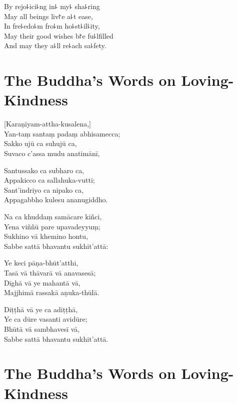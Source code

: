 \begin{english}
  By rejo꜕ici꜕ng in꜕ my꜕ sha꜕ring\\
  May all beings liv꜓e a꜕t ease,\\
  In fre꜕edo꜕m fro꜕m ho꜕st꜕il꜕ity,\\
  May their good wishes b꜓e fu꜕lfilled\\
  And may they a꜕ll re꜕ach sa꜕fety.
\end{english}

\chapter[Loving-Kindness]{The Buddha's Words on Loving-Kindness}%

\begin{leader}
\end{leader}

[Karaṇīyam-attha-kusalena,]\\
Yan-taṃ santaṃ padaṃ abhisamecca;\\
Sakko ujū ca suhujū ca,\\
Suvaco c'assa mudu anatimānī,

Santussako ca subharo ca,\\
Appakicco ca sallahuka-vutti;\\
Sant'indriyo ca nipako ca,\\
Appagabbho kulesu ananugiddho.

Na ca khuddaṃ samācare kiñci,\\
Yena viññū pare upavadeyyuṃ;\\
Sukhino vā khemino hontu,\\
Sabbe sattā bhavantu sukhit'attā:

Ye keci pāṇa-bhūt'atthi,\\
Tasā vā thāvarā vā anavasesā;\\
Dīghā vā ye mahantā vā,\\
Majjhimā rassakā aṇuka-thūlā.

Diṭṭhā vā ye ca adiṭṭhā,\\
Ye ca dūre vasanti avidūre;\\
Bhūtā vā sambhavesī vā,\\
Sabbe sattā bhavantu sukhit'attā.

\chapter[Loving-Kindness]{The Buddha's Words on Loving-Kindness}%

